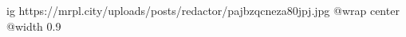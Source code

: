  
 
 
 
 

\ifcmt
  ig https://mrpl.city/uploads/posts/redactor/pajbzqcneza80jpj.jpg
  @wrap center
  @width 0.9
\fi	
